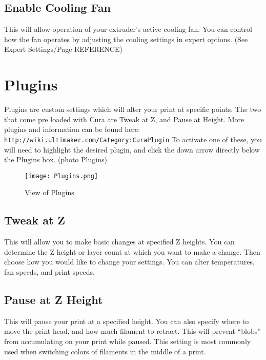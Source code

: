 \subsection{Enable Cooling Fan}

This will allow operation of your extruder's active cooling fan. You can control how the fan operates by adjusting the cooling settings in expert options. (See Expert Settings/Page REFERENCE)

\section{Plugins}

Plugins are custom settings which will alter your print at specific points. The two that come pre loaded with Cura are Tweak at Z, and Pause at Height. More plugins and information can be found here: \texttt{http://wiki.ultimaker.com/Category:CuraPlugin} To activate one of these, you will need to highlight the desired plugin, and click the down arrow directly below the Plugins box. (photo Plugins)
\begin{figure}[hbt]
\centering
\texttt{[image: Plugins.png]}
\caption{View of Plugins}
\label{fig:Plugins}
\end{figure}

\subsection{Tweak at Z}

This will allow you to make basic changes at specified Z heights. You can determine the Z height or layer count at which you want to make a change. Then choose how you would like to change your settings. You can alter temperatures, fan speeds, and print speeds.

\subsection{Pause at Z Height}

This will pause your print at a specified height. You can also specify where         to move the print head, and how much filament to retract. This will prevent “blobs” from accumulating on your print while paused. This setting is most commonly used when switching colors of filaments in the middle of a print.

